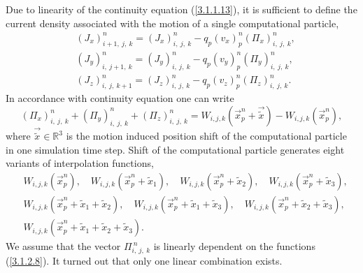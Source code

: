 Due to linearity of the continuity equation (\ref{3.1.1.13}), it is sufficient to define the current density associated with the motion of a single computational particle,
\begin{equation}
\label{3.1.2.4}
\begin{split}
& \left(J_{x}\right)_{i+1,\: j,\: k}^{n} = \left(J_{x}\right)_{i,\: j,\: k}^{n} - q_{p} \left(v_{x}\right)_{p}^{n} \left(\Pi_{x}\right)_{i,\: j,\: k}^{n}, \\
& \left(J_{y}\right)_{i,\: j+1,\: k}^{n} = \left(J_{y}\right)_{i,\: j,\: k}^{n} - q_{p} \left(v_{y}\right)_{p}^{n} \left(\Pi_{y}\right)_{i,\: j,\: k}^{n}, \\
& \left(J_{z}\right)_{i,\: j,\: k+1}^{n} = \left(J_{z}\right)_{i,\: j,\: k}^{n} - q_{p} \left(v_{z}\right)_{p}^{n} \left(\Pi_{z}\right)_{i,\: j,\: k}^{n}.
\end{split}
\end{equation}
In accordance with continuity equation one can write
\begin{equation}
\label{3.1.2.7}
\left(\Pi_{x}\right)_{i,\: j,\: k}^{n} + \left(\Pi_{y}\right)_{i,\: j,\: k}^{n} + \left(\Pi_{z}\right)_{i,\: j,\: k}^{n} = W_{i, j, k}\left(\vec{x}_{p}^{n} + \vec{\tilde{x}}\right) - W_{i, j, k}\left(\vec{x}_{p}^{n}\right),
\end{equation}
where $ \vec{\tilde{x}} \in \mathbb{R}^{3} $ is the motion induced position shift of the computational particle in one simulation time step. Shift of the computational particle generates eight variants of interpolation functions,
\begin{equation}
\label{3.1.2.8}
\begin{split}
& W_{i, j, k}\left(\vec{x}_{p}^{n}\right), \quad W_{i, j, k}\left(\vec{x}_{p}^{n} + \tilde{x}_{1}\right), \quad W_{i, j, k}\left(\vec{x}_{p}^{n} + \tilde{x}_{2}\right), \quad W_{i, j, k}\left(\vec{x}_{p}^{n} + \tilde{x}_{3}\right), \\
& W_{i, j, k}\left(\vec{x}_{p}^{n} + \tilde{x}_{1} + \tilde{x}_{2}\right), \quad W_{i, j, k}\left(\vec{x}_{p}^{n} + \tilde{x}_{1} + \tilde{x}_{3}\right), \quad W_{i, j, k}\left(\vec{x}_{p}^{n} + \tilde{x}_{2} + \tilde{x}_{3}\right), \\
& W_{i, j, k}\left(\vec{x}_{p}^{n} + \tilde{x}_{1} + \tilde{x}_{2} + \tilde{x}_{3}\right).
\end{split}
\end{equation}
We assume that the vector $ \Pi_{i,\: j,\: k}^{\:n} $ is linearly dependent on the functions (\ref{3.1.2.8}). It turned out that only one linear combination exists.


